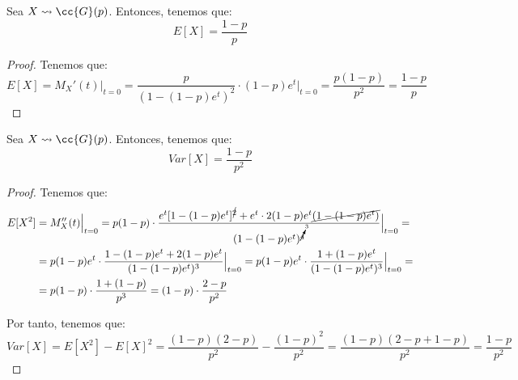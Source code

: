 \begin{coro}
    Sea $X\leadsto \cc{G}(p)$. Entonces, tenemos que:
    \begin{equation*}
        E[X] = \frac{1-p}{p}
    \end{equation*}
\end{coro}
\begin{proof}
    Tenemos que:
    \begin{equation*}
        E[X] = M_X'(t)\Big|_{t=0} = \frac{p}{(1-(1-p)e^t)^2}\cdot (1-p)e^t\Big|_{t=0} = \frac{p(1-p)}{p^2} = \frac{1-p}{p}
    \end{equation*}
\end{proof}

\begin{coro}
    Sea $X\leadsto \cc{G}(p)$. Entonces, tenemos que:
    \begin{equation*}
        Var[X] = \frac{1-p}{p^2}
    \end{equation*}
\end{coro}
\begin{proof}
    Tenemos que:
    \begin{align*}
        E[X^2] &= M_X''(t)\Big|_{t=0} = p(1-p)\cdot \dfrac{e^t[1-(1-p)e^t]^{\cancel{2}} + e^t\cdot 2(1-p)e^t\cancel{(1-(1-p)e^t)}}{(1-(1-p)e^t)^{\cancelto{3}{4}}}\Big|_{t=0} =\\
        &= p(1-p)e^t\cdot \dfrac{1-(1-p)e^t + 2(1-p)e^t}{(1-(1-p)e^t)^3}\Big|_{t=0}
        = p(1-p)e^t\cdot \dfrac{1+(1-p)e^t}{(1-(1-p)e^t)^3}\Big|_{t=0} =\\
        &= p(1-p)\cdot \dfrac{1+(1-p)}{p^3}
        = (1-p)\cdot \dfrac{2-p}{p^2}
    \end{align*}

    Por tanto, tenemos que:
    \begin{equation*}
        Var[X] = E[X^2] - E[X]^2
        = \dfrac{(1-p)(2-p)}{p^2} - \dfrac{(1-p)^2}{p^2}
        = \dfrac{(1-p)(2-p+1-p)}{p^2} = \dfrac{1-p}{p^2}
    \end{equation*}
\end{proof}

